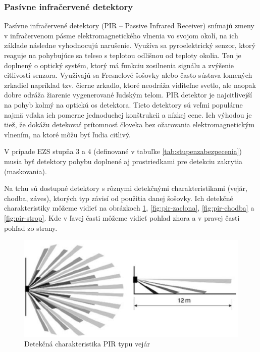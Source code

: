 \subsubsection{Pasívne infračervené detektory}\label{sec:pir}

Pasívne infračervené detektory (PIR – Passive Infrared Receiver) snímajú zmeny v infračervenom pásme elektromagnetického vlnenia vo svojom okolí, na ich základe následne vyhodnocujú narušenie. Využíva sa pyroelektrický senzor, ktorý reaguje na pohybujúce sa teleso s teplotou odlišnou od teploty okolia. Ten je doplnený o optický systém, ktorý má funkciu zosilnenia signálu a zvýšenie citlivosti senzora. Využívajú sa Fresnelové šošovky alebo často sústava lomených zrkadiel napríklad tzv. čierne zrkadlo, ktoré neodráža viditeľne svetlo, ale naopak dobre odráža žiarenie vygenerované ľudským telom. PIR detektor je najcitlivejší na pohyb kolmý na optickú os detektora. Tieto detektory sú veľmi populárne najmä vďaka ich pomerne jednoduchej konštrukcii a nízkej cene. Ich výhodou je tiež, že dokážu detekovať prítomnosť človeka bez ožarovania elektromagnetickým vlnením, na ktoré môžu byť ľudia citlivý.\cite{velas_ezs}

V prípade EZS stupňa 3 a 4 (definované v tabuľke \ref{tab:stupenzabezpecenia}) musia byť detektory pohybu doplnené aj prostriedkami pre detekciu zakrytia (maskovania).\cite{csn-en-50131-1}

Na trhu sú dostupné detektory s rôznymi detekčnými charakteristikami (vejár, chodba, záves),
ktorých typ závisí od použitia danej šošovky. Ich detekčné charakteristiky môžeme vidieť na obrázkoch \ref{fig:pir-vejar}, \ref{fig:pir-zaclona}, \ref{fig:pir-chodba} a \ref{fig:pir-strop}. Kde v ľavej časti môžeme vidieť pohľad zhora a v pravej časti pohľad zo strany.

\begin{figure}[!ht]
    \centering
    \includegraphics[width=0.75\linewidth]{obrazky-figures/PIR-vejar.png}
    \caption[Detekčná charakteristika PIR typu vejár]{Detekčná charakteristika PIR typu vejár\cite{PIR-vejar}}
    \label{fig:pir-vejar}
\end{figure}

